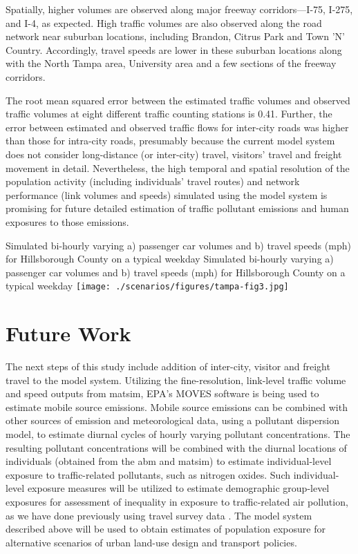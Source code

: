 Spatially, higher volumes are observed along major freeway corridors---I-75, I-275, and I-4, as expected. High traffic volumes are also observed along the road network near suburban locations, including Brandon, Citrus Park and Town 'N' Country. Accordingly, travel speeds are lower in these suburban locations along with the North Tampa area, University area and a few sections of the freeway corridors. 

The root mean squared error between the estimated traffic volumes and observed traffic volumes at eight different traffic counting stations is 0.41. Further, the error between estimated and observed traffic flows for inter-city roads was higher than those for intra-city roads, presumably because the current model system does not consider long-distance (or inter-city) travel, visitors' travel and freight movement in detail. Nevertheless, the high temporal and spatial resolution of the population activity (including individuals' travel routes) and network performance (\ie link volumes and speeds) simulated using the model system is promising for future detailed estimation of traffic pollutant emissions and human exposures to those emissions.  

\createfigure%
{Simulated bi-hourly varying a) passenger car volumes and b) travel speeds (mph) for Hillsborough County on a typical weekday}%
{Simulated bi-hourly varying a) passenger car volumes and b) travel speeds (mph) for Hillsborough County on a typical weekday}%
{\label{fig:tampa-fig3}}%
{\texttt{[image: ./scenarios/figures/tampa-fig3.jpg]}}%
{}

\section{Future Work}
The next steps of this study include addition of inter-city, visitor and freight travel to the model system. 
Utilizing the fine-resolution, link-level traffic volume and speed outputs from \gls{matsim}, EPA’s MOVES software is being used to estimate mobile source emissions. 
Mobile source emissions can be combined with other sources of emission and meteorological data, using a pollutant dispersion model, to estimate diurnal cycles of hourly varying pollutant concentrations. 
The resulting pollutant concentrations will be combined with the diurnal locations of individuals (obtained from the \gls{abm} and \gls{matsim}) to estimate individual-level exposure to traffic-related pollutants, such as nitrogen oxides. 
Such individual-level exposure measures will be utilized to estimate demographic group-level exposures for assessment of inequality in exposure to traffic-related air pollution, as we have done previously using travel survey data \citep[][]{GurramEtAl_AQAH_2015}. 
The model system described above will be used to obtain estimates of population exposure for alternative scenarios of urban land-use design and transport policies.

